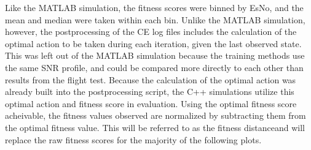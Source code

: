 
\par Like the MATLAB simulation, the fitness scores were binned by EsNo, and the mean and median were taken within each bin. Unlike the MATLAB simulation, however, the postprocessing of the CE log files includes the calculation of the optimal action to be taken during each iteration, given the last observed state. This was left out of the MATLAB simulation because the training methods use the same SNR profile, and could be compared more directly to each other than results from the flight test. Because the calculation of the optimal action was already built into the postprocessing script, the C++ simulations utilize this optimal action and fitness score in evaluation. Using the optimal fitness score acheivable, the fitness values observed are normalized by subtracting them from the optimal fitness value. This will be referred to as the fitness distanceand will replace the raw fitness scores for the majority of the following plots.
